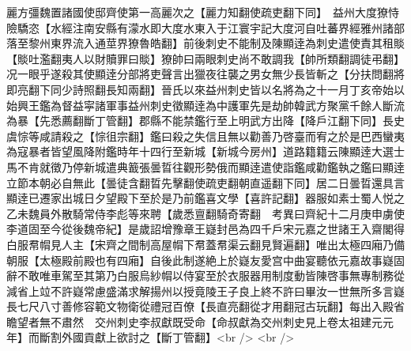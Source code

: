 麗方彊魏置諸國使邸齊使第一高麗次之【麗力知翻使疏吏翻下同】　益州大度獠恃險驕恣【水經注南安縣有濛水即大度水東入于江寰宇記大度河自吐蕃界經雅州諸部落至黎州東界流入通莖界獠魯皓翻】前後刺史不能制及陳顯逹為刺史遣使責其租賧【賧吐濫翻夷人以財贖罪曰賧】獠帥曰兩眼刺史尚不敢調我【帥所類翻調徒弔翻】况一眼乎遂殺其使顯逹分部將吏聲言出獵夜往襲之男女無少長皆斬之【分扶問翻將即亮翻下同少詩照翻長知兩翻】晉氏以來益州刺史皆以名將為之十一月丁亥帝始以始興王鑑為督益寜諸軍事益州刺史徵顯逹為中護軍先是劫帥韓武方聚黨千餘人斷流為暴【先悉薦翻斷丁管翻】郡縣不能禁鑑行至上明武方出降【降戶江翻下同】長史虞悰等咸請殺之【悰徂宗翻】鑑曰殺之失信且無以勸善乃啓臺而宥之於是巴西蠻夷為寇暴者皆望風降附鑑時年十四行至新城【新城今房州】道路籍籍云陳顯逹大選士馬不肯就徵乃停新城遣典籖張曇晢往觀形勢俄而顯逹遣使詣鑑咸勸鑑執之鑑曰顯逹立節本朝必自無此【曇徒含翻晢先擊翻使疏吏翻朝直遥翻下同】居二日曇晢還具言顯逹已遷家出城日夕望殿下至於是乃前鑑喜文學【喜許記翻】器服如素士蜀人悦之　乙未魏員外散騎常侍李彪等來聘【歲悉亶翻騎奇寄翻　考異曰齊紀十二月庚申虜使李道固至今從後魏帝紀】是歲詔增豫章王嶷封邑為四千戶宋元嘉之世諸王入齋閣得白服帬㡌見人主【宋齊之間制高屋㡌下帬蓋帬渠云翻見賢遍翻】唯出太極四廂乃備朝服【太極殿前殿也有四廂】自後此制遂絶上於嶷友愛宫中曲宴聽依元嘉故事嶷固辭不敢唯車駕至其第乃白服烏紗㡌以侍宴至於衣服器用制度動皆陳啓事無專制務從減省上竝不許嶷常慮盛滿求解揚州以授竟陵王子良上終不許曰畢汝一世無所多言嶷長七尺八寸善修容範文物衛從禮冠百僚【長直亮翻從才用翻冠古玩翻】每出入殿省瞻望者無不肅然　交州刺史李叔獻既受命【命叔獻為交州刺史見上卷太祖建元元年】而斷割外國貢獻上欲討之【斷丁管翻】<br />
<br />
